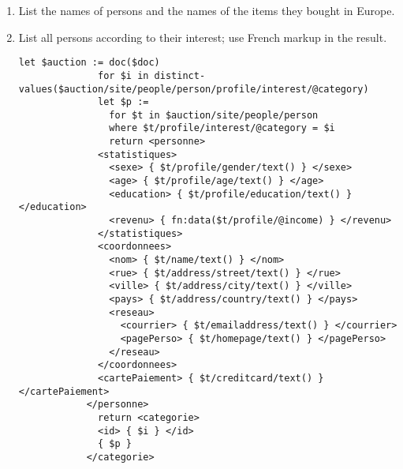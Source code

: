 \begin{enumerate}[label=Q\arabic*.]
		\item %
			List the names of persons and the names of the items they bought in Europe.
		\item %
			List all persons according to their interest; use French markup in the result.
		\begin{lstlisting}[style=XQuery,float=ht]
			let $auction := doc($doc)
              for $i in distinct-values($auction/site/people/person/profile/interest/@category)
              let $p :=
                for $t in $auction/site/people/person
                where $t/profile/interest/@category = $i
                return <personne>
              <statistiques>
                <sexe> { $t/profile/gender/text() } </sexe>
                <age> { $t/profile/age/text() } </age>
                <education> { $t/profile/education/text() } </education>
                <revenu> { fn:data($t/profile/@income) } </revenu>
              </statistiques>
              <coordonnees>
                <nom> { $t/name/text() } </nom>
                <rue> { $t/address/street/text() } </rue>
                <ville> { $t/address/city/text() } </ville>
                <pays> { $t/address/country/text() } </pays>
                <reseau>
                  <courrier> { $t/emailaddress/text() } </courrier>
                  <pagePerso> { $t/homepage/text() } </pagePerso>
                </reseau>
              </coordonnees>
              <cartePaiement> { $t/creditcard/text() } </cartePaiement>
            </personne>
              return <categorie>
              <id> { $i } </id>
              { $p }
            </categorie>
		\end{lstlisting}	

\end{enumerate}
